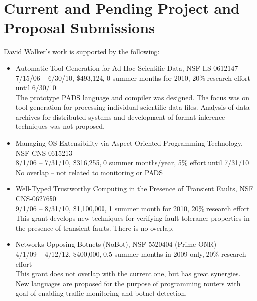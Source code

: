\documentclass[12pt]{article}
\begin{document}
\newpage
\section{Current and Pending Project and Proposal Submissions}

David Walker's work is supported by the following:

\begin{itemize}
\item Automatic Tool Generation for Ad Hoc Scientific Data, 
NSF   IIS-0612147 \\
7/15/06 -- 6/30/10, \$493,124, 0 summer months for 2010, 
20\% research effort until 6/30/10 \\
The prototype PADS language and compiler was designed.  The focus
was on tool generation for processing individual scientific data
files.  Analysis of data archives for distributed systems and
development of format inference techniques was not proposed.

\item Managing OS Extensibility via Aspect Oriented Programming Technology, 
NSF   CNS-0615213 \\
8/1/06 -- 7/31/10, \$316,255, 0 summer months/year, 
5\% effort until 7/31/10 \\
No overlap -- not related to monitoring or PADS

\item Well-Typed Trustworthy Computing in the Presence of Transient Faults, 
NSF   CNS-0627650 \\
9/1/06 -- 8/31/10, \$1,100,000, 1 summer month for 2010, 
20\% research effort \\
This grant develops new techniques for verifying fault tolerance
properties in the presence of transient faults.  There is no overlap.

\item Networks Opposing Botnets (NoBot),
NSF   5520404 (Prime ONR) \\
4/1/09 -- 4/12/12, \$400,000, 0.5 summer months in 2009 only,
20\% research effort \\
This grant does not overlap with the current one, but has great
synergies.  New languages are proposed for the purpose of programming
routers with goal of enabling traffic monitoring and botnet detection.

\end {itemize}
\end{document}

